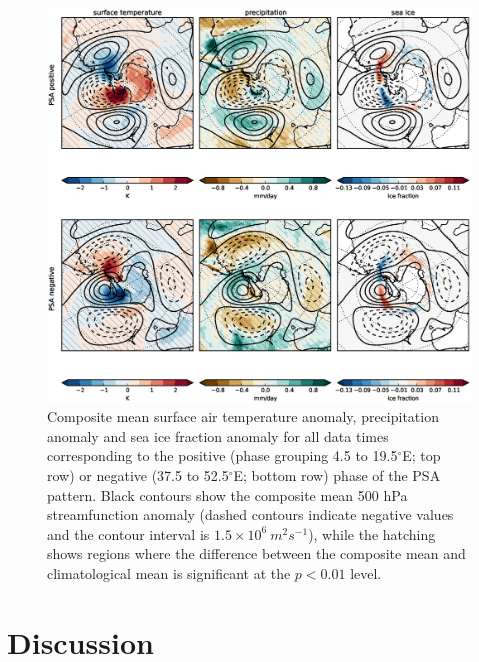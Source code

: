 \begin{figure}
\begin{center}
\includegraphics[width=1\columnwidth]{figures/psa/psa-var-composites-phase-range_ERAInterim_500hPa-lat10S10Nmean-lon115E235Ezeropad_030day-runmean-anom-wrt-all_native-np20N260E.eps}
\caption[Composite mean surface air temperature anomaly, precipitation anomaly and sea ice fraction anomaly for all data times corresponding to the positive or negative phase of the PSA pattern]{\label{fig:surface_composites}
Composite mean surface air temperature anomaly, precipitation anomaly and sea ice fraction anomaly for all data times corresponding to the positive (phase grouping 4.5 to 19.5$^{\circ}$E; top row) or negative (37.5 to 52.5$^{\circ}$E; bottom row) phase of the PSA pattern. Black contours show the composite mean 500 hPa streamfunction anomaly (dashed contours indicate negative values and the contour interval is $1.5 \times 10^6 \: m^2 s^{-1}$), while the hatching shows regions where the difference between the composite mean and climatological mean is significant at the $p < 0.01$ level.%
}
\end{center}
\end{figure}



\section{Discussion}

